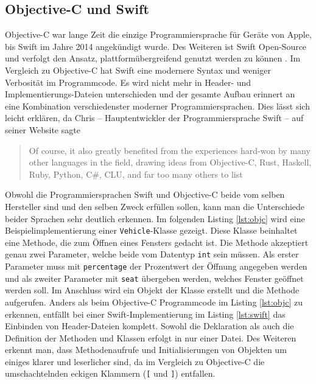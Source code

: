 \subsection{Objective-C und Swift}
Objective-C war lange Zeit die einzige Programmiersprache für Geräte von Apple, bis Swift im Jahre 2014 angekündigt wurde.
Des Weiteren ist Swift Open-Source und verfolgt den Ansatz, plattformübergreifend genutzt werden zu können \parencite{APP2020}.
Im Vergleich zu Objective-C hat Swift eine modernere Syntax und weniger Verbosität im Programmcode.
Es wird nicht mehr in Header- und Implementierungs-Dateien unterschieden und der gesamte Aufbau erinnert an eine Kombination verschiedenster moderner Programmiersprachen.
Dies lässt sich leicht erklären, da Chris \textcite{LAT} – Hauptentwickler der Programmiersprache Swift – auf seiner Website sagte \blockquote{Of course, it also greatly benefited from the experiences hard-won by many other languages in the field, drawing ideas from Objective-C, Rust, Haskell, Ruby, Python, C\#, CLU, and far too many others to list}.\pbreak%
%
Obwohl die Programmiersprachen Swift und Objective-C beide vom selben Hersteller sind und den selben Zweck erfüllen sollen, kann man die Unterschiede beider Sprachen sehr deutlich erkennen.
Im folgenden Listing \ref{lst:objc} wird eine Beispielimplementierung einer \texttt{Vehicle}-Klasse gezeigt. Diese Klasse beinhaltet eine Methode, die zum Öffnen eines Fensters gedacht ist.
Die Methode akzeptiert genau zwei Parameter, welche beide vom Datentyp \texttt{int} sein müssen.
Als erster Parameter muss mit \texttt{percentage} der Prozentwert der Öffnung angegeben werden und als zweiter Parameter mit \texttt{seat} übergeben werden, welches Fenster geöffnet werden soll.
Im Anschluss wird ein Objekt der Klasse erstellt und die Methode aufgerufen.
Anders als beim Objective-C Programmcode im Listing \ref{lst:objc} zu erkennen, entfällt bei einer Swift-Implementierung im Listing \ref{lst:swift} das Einbinden von Header-Dateien komplett.
Sowohl die Deklaration als auch die Definition der Methoden und Klassen erfolgt in nur einer Datei.
Des Weiteren erkennt man, dass Methodenaufrufe und Initialisierungen von Objekten um einiges klarer und leserlicher sind, da im Vergleich zu Objective-C die umschachtelnden eckigen Klammern (\texttt{[} und \texttt{]}) entfallen.

